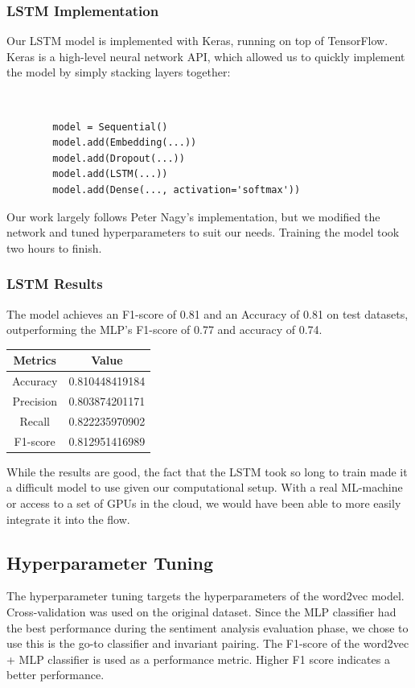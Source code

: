 \documentclass{sig-alternate-05-2015}
\begin{document}
	\subsubsection{LSTM Implementation}
	Our LSTM model is implemented with Keras, running on top of TensorFlow. Keras is a high-level neural network API, which allowed us to quickly implement the model by simply stacking layers together:
	{\tt \small
		\begin{verbatim}
		model = Sequential()
		model.add(Embedding(...))
		model.add(Dropout(...))
		model.add(LSTM(...))
		model.add(Dense(..., activation='softmax'))
		\end{verbatim}
	}
	
	Our work largely follows Peter Nagy's implementation\cite{peter}, but we modified the network and tuned hyperparameters to suit our needs. Training the model took two hours to finish.
	
	\subsubsection{LSTM Results}
	The model achieves an F1-score of 0.81 and an Accuracy of 0.81 on test datasets, outperforming the MLP's F1-score of 0.77 and accuracy of 0.74.  \\
	
	\begin{center}
		\begin{tabular}{|c|c|}
			
			\hline
			Metrics & Value \\
			\hline
			Accuracy & 0.810448419184 \\
			Precision & 0.803874201171 \\
			Recall & 0.822235970902 \\
			F1-score & 0.812951416989 \\
			\hline
		\end{tabular}
	\end{center}
	
	While the results are good, the fact that the LSTM took so long to train made it a difficult model to use given our computational setup. With a real ML-machine or access to a set of GPUs in the cloud, we would have been able to more easily integrate it into the flow.
	\subsection{Hyperparameter Tuning}
	The hyperparameter tuning targets the hyperparameters of the word2vec model. Cross-validation was used on the original dataset. Since the MLP classifier had the best performance during the sentiment analysis evaluation phase, we chose to use this is the go-to classifier and invariant pairing. The F1-score of the word2vec + MLP classifier is used as a performance metric. Higher F1 score indicates a better performance. 
\end{document}
